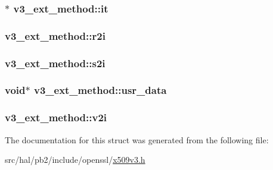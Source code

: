 \subsubsection[{\texorpdfstring{it}{it}}]{$\ast$ v3\+\_\+ext\+\_\+method\+::it}\hypertarget{structv3__ext__method_a6f57d2623c9652447056936691e7325f}{}\label{structv3__ext__method_a6f57d2623c9652447056936691e7325f}
\subsubsection[{\texorpdfstring{r2i}{r2i}}]{ v3\+\_\+ext\+\_\+method\+::r2i}\hypertarget{structv3__ext__method_a58e1a54a66185f358d7859e771a9a39a}{}\label{structv3__ext__method_a58e1a54a66185f358d7859e771a9a39a}
\subsubsection[{\texorpdfstring{s2i}{s2i}}]{ v3\+\_\+ext\+\_\+method\+::s2i}\hypertarget{structv3__ext__method_afe843df7c11d126f43aa7ed05538d572}{}\label{structv3__ext__method_afe843df7c11d126f43aa7ed05538d572}
\subsubsection[{\texorpdfstring{usr\+\_\+data}{usr_data}}]{\setlength{\rightskip}{0pt plus 5cm}void$\ast$ v3\+\_\+ext\+\_\+method\+::usr\+\_\+data}\hypertarget{structv3__ext__method_a9a1b284354290f1f8d5d375a194c75e6}{}\label{structv3__ext__method_a9a1b284354290f1f8d5d375a194c75e6}
\subsubsection[{\texorpdfstring{v2i}{v2i}}]{ v3\+\_\+ext\+\_\+method\+::v2i}\hypertarget{structv3__ext__method_ab0699c47258c61200f7189fe888f7aab}{}\label{structv3__ext__method_ab0699c47258c61200f7189fe888f7aab}


The documentation for this struct was generated from the following file\+:\begin{DoxyCompactItemize}
\item 
src/hal/pb2/include/openssl/\hyperlink{x509v3_8h}{x509v3.\+h}\end{DoxyCompactItemize}
